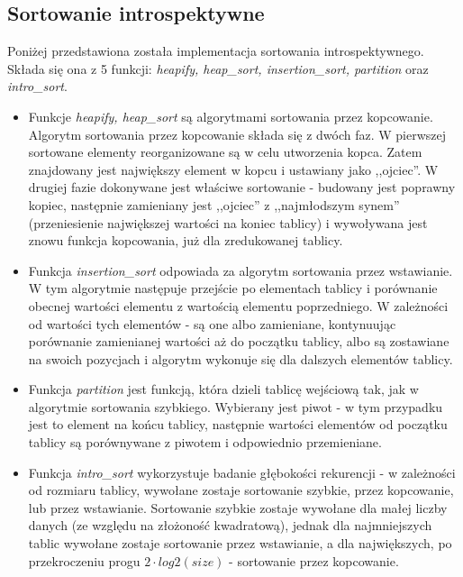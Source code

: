 \subsection{Sortowanie introspektywne}
Poniżej przedstawiona została implementacja sortowania introspektywnego. Składa się ona z 5 funkcji: \textit{heapify, heap\_sort, insertion\_sort, partition} oraz \textit{intro\_sort}.
\begin{itemize}
    \item Funkcje \textit{heapify, heap\_sort} są algorytmami sortowania przez kopcowanie. Algorytm sortowania przez kopcowanie składa się z dwóch faz. W pierwszej sortowane elementy reorganizowane są w celu utworzenia kopca. Zatem znajdowany jest największy element w kopcu i ustawiany jako ,,ojciec''. W drugiej fazie dokonywane jest właściwe sortowanie - budowany jest poprawny kopiec, następnie zamieniany jest ,,ojciec'' z ,,najmłodszym synem'' (przeniesienie największej wartości na koniec tablicy) i wywoływana jest znowu funkcja kopcowania, już dla zredukowanej tablicy. 
    \item Funkcja \textit{insertion\_sort} odpowiada za algorytm sortowania przez wstawianie. W tym algorytmie następuje przejście po elementach tablicy i porównanie obecnej wartości elementu z wartością elementu poprzedniego. W zależności od wartości tych elementów - są one albo zamieniane, kontynuując porównanie zamienianej wartości aż do początku tablicy, albo są zostawiane na swoich pozycjach i algorytm wykonuje się dla dalszych elementów tablicy.
    \item Funkcja \textit{partition} jest funkcją, która dzieli tablicę wejściową tak, jak w algorytmie sortowania szybkiego. Wybierany jest piwot - w tym przypadku jest to element na końcu tablicy, następnie wartości elementów od początku tablicy są porównywane z piwotem i odpowiednio przemieniane.
    \item Funkcja \textit{intro\_sort} wykorzystuje badanie głębokości rekurencji - w zależności od rozmiaru tablicy, wywołane zostaje sortowanie szybkie, przez kopcowanie, lub przez wstawianie. Sortowanie szybkie zostaje wywołane dla małej liczby danych (ze względu na złożoność kwadratową), jednak dla najmniejszych tablic wywołane zostaje sortowanie przez wstawianie, a dla największych, po przekroczeniu progu $2 \cdot log2 (size)$ - sortowanie przez kopcowanie.
    
\end{itemize}

